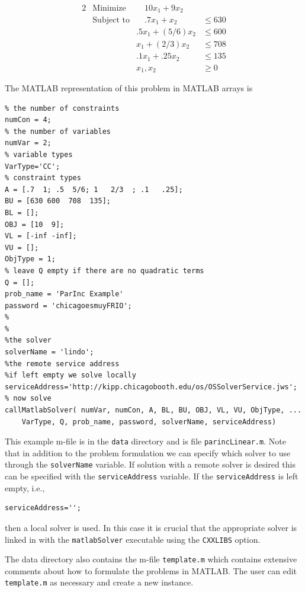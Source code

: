 \documentclass[11pt]{article}
\renewcommand{\_}{{\char"5F}}
\renewcommand{\{}{{\char"7B}}
\renewcommand{\}}{{\char"7D}}
\renewcommand{\^}{{\char"0D}}
\renewcommand{\'}{{\char"0D}}
\begin{document}
\begin{enumerate}[Step 1:]
\begin{alignat}{2}
& \mbox{Minimize} & \quad
10 x_{1} + 9 x_{2}\label{eq:parinobj}\\
& \mbox{Subject to} & \quad .7x_{1} + x_{2}  &\le 630  \label{eq:parinccon1}\\
& & .5x_{1} + (5/6) x_{2} &\le 600 \label{eq:parinccon2}\\
& &  x_{1} + (2/3) x_{2} &\le 708 \label{eq:parinccon3}\\
& & .1x_{1} + .25 x_{2} &\le 135 \label{eq:parinccon4}\\
& & x_{1}, x_{2} &\ge 0 \label{eq:parincnonneg}
\end{alignat}

The MATLAB representation of this problem in MATLAB arrays is
\begin{verbatim}
% the number of constraints
numCon = 4;
% the number of variables
numVar = 2;
% variable types
VarType='CC';
% constraint types
A = [.7  1; .5  5/6; 1   2/3  ; .1   .25];
BU = [630 600  708  135];
BL = [];
OBJ = [10  9];
VL = [-inf -inf];
VU = [];
ObjType = 1;
% leave Q empty if there are no quadratic terms
Q = [];
prob_name = 'ParInc Example'
password = 'chicagoesmuyFRIO';
%
%
%the solver
solverName = 'lindo';
%the remote service address
%if left empty we solve locally
serviceAddress='http://kipp.chicagobooth.edu/os/OSSolverService.jws';
% now solve
callMatlabSolver( numVar, numCon, A, BL, BU, OBJ, VL, VU, ObjType, ...
    VarType, Q, prob_name, password, solverName, serviceAddress)
\end{verbatim}
This example m-file is in the {\tt data} directory and is file {\tt parincLinear.m}. Note that in addition to the problem formulation
we can specify which solver to use through the {\tt solverName} variable.  If solution with a remote solver is desired
this can be specified with the {\tt serviceAddress} variable.  If the {\tt serviceAddress} is left empty, i.e.,
\begin{verbatim}
serviceAddress='';
\end{verbatim}
then a local solver is used. In this case  it is crucial that the appropriate solver is linked in with the {\tt matlabSolver}
executable using the {\tt CXXLIBS} option.


The data directory  also contains the m-file  {\tt template.m} which contains extensive comments about how to formulate
the problems in MATLAB.   The user can edit {\tt template.m} as necessary and create a new instance.





\end{enumerate}
\end{document}
